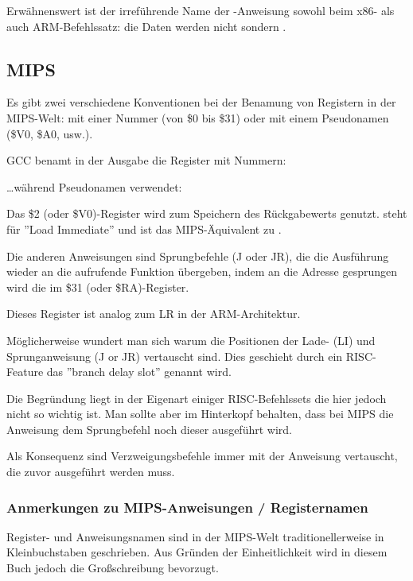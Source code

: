 Erwähnenswert ist der irreführende Name der \MOV-Anweisung sowohl beim x86- als auch ARM-Befehlssatz:
die Daten werden nicht  sondern .

\subsection{MIPS}

\label{MIPS_leaf_function_ex1}
Es gibt zwei verschiedene Konventionen bei der Benamung von Registern in der MIPS-Welt:
mit einer Nummer (von \$0 bis \$31) oder mit einem Pseudonamen (\$V0, \$A0, usw.).

GCC benamt in der Ausgabe die Register mit Nummern:



\dots während \IDA Pseudonamen verwendet:



Das \$2 (oder \$V0)-Register wird zum Speichern des Rückgabewerts genutzt.
 steht für ''Load Immediate'' und ist das MIPS-Äquivalent zu \MOV.

Die anderen Anweisungen sind Sprungbefehle (J oder JR), die die Ausführung wieder an die aufrufende Funktion übergeben,
indem an die Adresse gesprungen wird die im \$31 (oder \$RA)-Register.

Dieses Register ist analog zum \ac{LR} in der ARM-Architektur.

Möglicherweise wundert man sich warum die Positionen der Lade- (LI) und Sprunganweisung (J or JR) vertauscht sind.
Dies geschieht durch ein \ac{RISC}-Feature das ''branch delay slot'' genannt wird.

Die Begründung liegt in der Eigenart einiger RISC-Befehlssets die hier jedoch nicht so wichtig ist. Man sollte
aber im Hinterkopf behalten, dass bei MIPS die Anweisung  dem Sprungbefehl noch  dieser ausgeführt wird.

Als Konsequenz sind Verzweigungsbefehle immer mit der Anweisung vertauscht, die zuvor ausgeführt werden muss.

\subsubsection{Anmerkungen zu MIPS-Anweisungen / Registernamen}

Register- und Anweisungsnamen sind in der MIPS-Welt traditionellerweise in Kleinbuchstaben geschrieben.
Aus Gründen der Einheitlichkeit wird in diesem Buch jedoch die Großschreibung bevorzugt.

